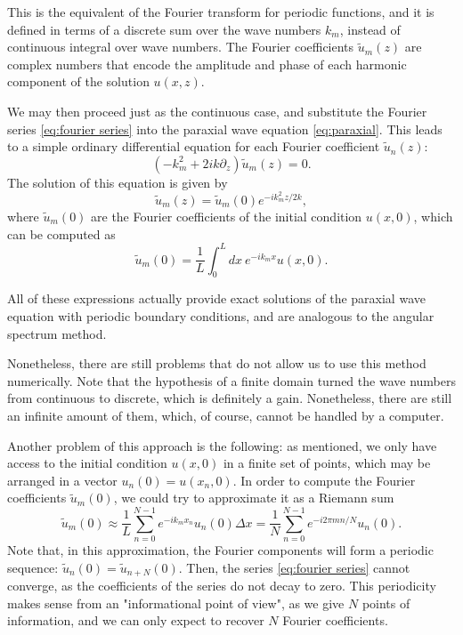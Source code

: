 \documentclass[a4paper,10pt]{report}
\begin{document}
This is the equivalent of the Fourier transform for periodic functions, and it is defined in terms of a discrete sum over the wave numbers $k_m$, instead of continuous integral over wave numbers. The Fourier coefficients $\tilde{u}_m(z)$ are complex numbers that encode the amplitude and phase of each harmonic component of the solution $u(x,z)$.

We may then proceed just as the continuous case, and substitute the Fourier series \eqref{eq:fourier series} into the paraxial wave equation \eqref{eq:paraxial}. This leads to a simple ordinary differential equation for each Fourier coefficient $\tilde{u}_n(z)$:
\begin{equation}
    \left( -k_m^2 + 2ik \partial_z \right) \tilde{u}_m(z) = 0.
\end{equation}
The solution of this equation is given by
\begin{equation}
    \label{eq:solution_paraxial_fourier_discrete}
    \tilde{u}_m(z) = \tilde{u}_m(0) e^{-i k_m^2 z / 2k},
\end{equation}
where $\tilde{u}_m(0)$ are the Fourier coefficients of the initial condition $u(x,0)$, which can be computed as
\begin{equation}
    \tilde{u}_m(0) = \frac{1}{L} \int_0^L dx \ e^{-i k_m x} u(x,0).
\end{equation}

All of these expressions actually provide exact solutions of the paraxial wave equation with periodic boundary conditions, and are analogous to the angular spectrum method. 

Nonetheless, there are still problems that do not allow us to use this method numerically. Note that the hypothesis of a finite domain turned the wave numbers from continuous to discrete, which is definitely a gain. Nonetheless, there are still an infinite amount of them, which, of course, cannot be handled by a computer.

Another problem of this approach is the following: as mentioned, we only have access to the initial condition $u(x,0)$ in a finite set of points, which may be arranged in a vector $u_n(0) = u(x_n,0)$. In order to compute the Fourier coefficients $\tilde{u}_m(0)$, we could try to approximate it as a Riemann sum
\begin{equation}
    \label{eq:fourier coefficients approximation}
    \tilde{u}_m(0) \approx \frac{1}{L} \sum_{n=0}^{N-1} e^{-i k_m x_n} u_n(0) \Delta x = \frac{1}{N} \sum_{n=0}^{N-1} e^{-i 2\pi mn/N} u_n(0).
\end{equation}
Note that, in this approximation, the Fourier components will form a periodic sequence: $\tilde{u}_n(0) = \tilde{u}_{n+N}(0)$. Then, the series \eqref{eq:fourier series} cannot converge, as the coefficients of the series do not decay to zero. This periodicity makes sense from an "informational point of view", as we give $N$ points of information, and we can only expect to recover $N$ Fourier coefficients.
\end{document}
